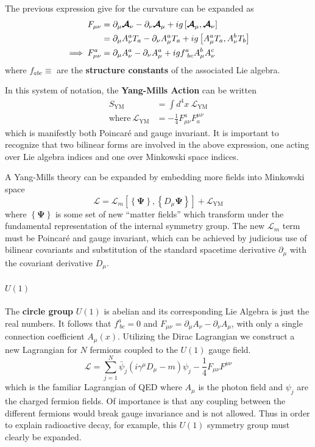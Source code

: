 The previous expression give for the curvature can be expanded as
\begin{align}
    F_{\mu\nu} &= \partial_\mu  \boldsymbol{\mathcal{A}} _\nu - \partial_\nu  \boldsymbol{\mathcal{A}} _\mu + ig \left[ { \boldsymbol{\mathcal{A}} _\mu},{ \boldsymbol{\mathcal{A}} _\nu} \right] \\
    &= \partial_\mu A_\nu^aT_a - \partial_\nu A_\mu^aT_a + ig \left[ {A_\mu^aT_a},{A_\nu^bT_b} \right] \\
    \implies F_{\mu\nu}^a &= \partial_\mu A_\nu^a - \partial_\nu A_\mu^a + igf^a_{\ bc}A_\mu^bA_\nu^c
\end{align}
where $f_{abc} \equiv $ are the \textbf{structure constants} of the associated Lie algebra.

In this system of notation, the \textbf{Yang-Mills Action} can be written
\newcommand{\YML}{ \ensuremath{ \mathcal{L}_{\mathrm{YM}} } }
\begin{align}
    S_{\mathrm{YM}} &= \int d^4x\ \YML\\
    \mathrm{where}\ \YML &= -\frac{1}{4} F_{\mu\nu}^a F^{\mu\nu}_a
\end{align}
which is manifestly both Poincar\'{e} and gauge invariant. It is important to recognize that two bilinear forms are involved in the above expression, one acting over Lie algebra indices and one over Minkowski space indices.

A Yang-Mills theory can be expanded by embedding more fields into Minkowski space
\newcommand{\YM}{ \ensuremath{ \mathcal{L}_m\left[ \left\{ \boldsymbol\Psi \right\}, \left\{ D_\mu \boldsymbol\Psi \right\} \right] }}
\begin{equation}
    \mathcal{L} = \YM + \YML
\end{equation}
where $\left\{ \boldsymbol\Psi \right\}$ is some set of new ``matter fields'' which transform under the fundamental representation of the internal symmetry group.
The new $\mathcal{L}_m$ term must be Poincar\'{e} and gauge invariant, which can be achieved by judicious use of bilinear covariants and substitution of the standard spacetime derivative $\partial_\mu$ with the covariant derivative $D_\mu$.
 
\paragraph{$U(1)$}
The \textbf{circle group} $U(1)$ is abelian and its corresponding Lie Algebra is just the real numbers. It follows that $f^a_{\ bc} = 0$ and 
$F_{\mu\nu} = \partial_\mu A_\nu - \partial_\nu A_\mu$, with only a single connection coefficient $A_\mu(x)$.
Utilizing the Dirac Lagrangian we construct a new Lagrangian for $N$ fermions coupled to the $U(1)$ gauge field.
\begin{equation}
    \mathcal{L} = \sum_{j=1}^{N} \bar{\psi}_j \left( i\gamma^\mu D_\mu - m \right) \psi_j - \frac{1}{4}F_{\mu\nu}F^{\mu\nu}
\end{equation}
which is the familiar Lagrangian of QED where $A_\mu$ is the photon field and $\psi_j$ are the charged fermion fields.
Of importance is that any coupling between the different fermions would break gauge invariance and is not allowed.
Thus in order to explain radioactive decay, for example, this $U(1)$ symmetry group must clearly be expanded.

